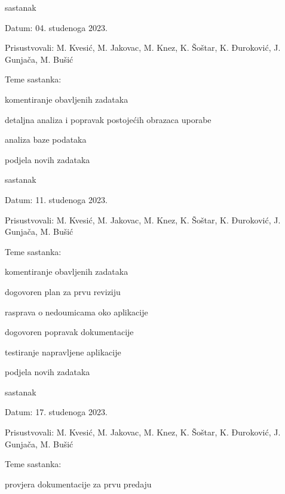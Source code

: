 \begin{packed_enum}
			\item  sastanak
			\item[] \begin{packed_item}
				\item Datum: 04. studenoga 2023.
				\item Prisustvovali: M. Kvesić, M. Jakovac, M. Knez, K. Šoštar, K. Đuroković, J. Gunjača, M. Bušić
				\item Teme sastanka:
				\begin{packed_item}
					\item  komentiranje obavljenih zadataka
					\item  detaljna analiza i popravak postojećih obrazaca uporabe
					\item  analiza baze podataka
					\item  podjela novih zadataka
				\end{packed_item}
			\end{packed_item}
			
			\item  sastanak
			\item[] \begin{packed_item}
				\item Datum: 11. studenoga 2023.
				\item Prisustvovali: M. Kvesić, M. Jakovac, M. Knez, K. Šoštar, K. Đuroković, J. Gunjača, M. Bušić
				\item Teme sastanka:
				\begin{packed_item}
					\item  komentiranje obavljenih zadataka
					\item  dogovoren plan za prvu reviziju
					\item  rasprava o nedoumicama oko aplikacije
					\item  dogovoren popravak dokumentacije
					\item  testiranje napravljene aplikacije
					\item  podjela novih zadataka
				\end{packed_item}
			\end{packed_item}
			
			\item  sastanak
			\item[] \begin{packed_item}
				\item Datum: 17. studenoga 2023.
				\item Prisustvovali: M. Kvesić, M. Jakovac, M. Knez, K. Šoštar, K. Đuroković, J. Gunjača, M. Bušić
				\item Teme sastanka:
				\begin{packed_item}
					\item  provjera dokumentacije za prvu predaju
				\end{packed_item}
			\end{packed_item}
			

\end{packed_enum}
